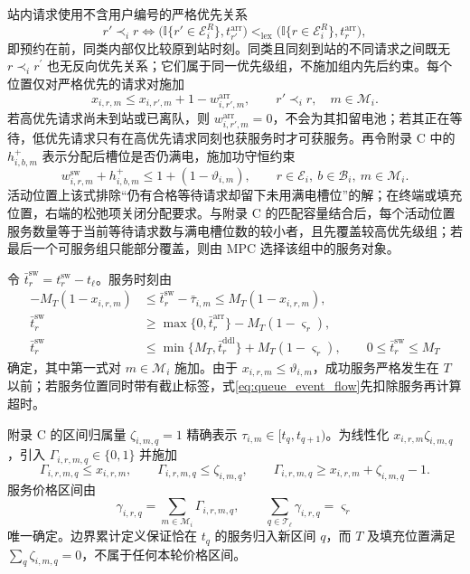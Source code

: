 \documentclass[12pt,a4paper,UTF8]{ctexart}
\begin{document}
站内请求使用不含用户编号的严格优先关系
\begin{equation}
r'\prec_i r
\Longleftrightarrow
\bigl(\mathbb I\{r'\in\mathcal E_i^R\},
t_{r'}^{\mathrm{arr}}\bigr)
<_{\mathrm{lex}}
\bigl(\mathbb I\{r\in\mathcal E_i^R\},
t_r^{\mathrm{arr}}\bigr),
\label{eq:reservation_priority}
\end{equation}
即预约在前，同类内部仅比较原到站时刻。同类且同刻到站的不同请求之间既无 $r\prec_i r^{\prime}$ 也无反向优先关系；它们属于同一优先级组，不施加组内先后约束。每个位置仅对严格优先的请求对施加
\begin{equation}
x_{i,r,m}
\le x_{i,r',m}+1-w_{i,r',m}^{\mathrm{arr}},
\qquad r'\prec_i r,\quad m\in\mathcal M_i.
\label{eq:reservation_service_order}
\end{equation}
若高优先请求尚未到站或已离队，则
$w_{i,r',m}^{\mathrm{arr}}=0$，不会为其扣留电池；若其正在等待，低优先请求只有在高优先请求同刻也获服务时才可获服务。再令附录 C 中的 $h_{i,b,m}^+$ 表示分配后槽位是否仍满电，施加功守恒约束
\begin{equation}
w_{i,r,m}^{\mathrm{sw}}+h_{i,b,m}^{+}
\le1+(1-\vartheta_{i,m}),
\qquad r\in\mathcal E_i,\ b\in\mathcal B_i,\ m\in\mathcal M_i.
\label{eq:work_conservation}
\end{equation}
活动位置上该式排除“仍有合格等待请求却留下未用满电槽位”的解；在终端或填充位置，右端的松弛项关闭分配要求。与附录 C 的匹配容量结合后，每个活动位置服务数量等于当前等待请求数与满电槽位数的较小者，且先覆盖较高优先级组；若最后一个可服务组只能部分覆盖，则由 MPC 选择该组中的服务对象。

令 $\bar t_r^{\mathrm{sw}}=t_r^{\mathrm{sw}}-t_\ell$。服务时刻由
\begin{subequations}
\label{eq:service_window}
\begin{align}
-M_T(1-x_{i,r,m})
&\le \bar t_r^{\mathrm{sw}}-\bar\tau_{i,m}
\le M_T(1-x_{i,r,m}),\\
\bar t_r^{\mathrm{sw}}
&\ge \max\{0,\bar t_r^{\mathrm{arr}}\}
-M_T(1-\varsigma_r),\\
\bar t_r^{\mathrm{sw}}
&\le \min\{M_T,\bar t_r^{\mathrm{ddl}}\}
+M_T(1-\varsigma_r),\qquad
0\le\bar t_r^{\mathrm{sw}}\le M_T
\end{align}
\end{subequations}
确定，其中第一式对 $m\in\mathcal M_i$ 施加。由于 $x_{i,r,m}\le \vartheta_{i,m}$，成功服务严格发生在 $T$ 以前；若服务位置同时带有截止标签，式\eqref{eq:queue_event_flow}先扣除服务再计算超时。

附录 C 的区间归属量 $\zeta_{i,m,q}=1$ 精确表示
$\tau_{i,m}\in[t_q,t_{q+1})$。为线性化
$x_{i,r,m}\zeta_{i,m,q}$，引入
$\Gamma_{i,r,m,q}\in\{0,1\}$ 并施加
\[
\Gamma_{i,r,m,q}\le x_{i,r,m},\qquad
\Gamma_{i,r,m,q}\le\zeta_{i,m,q},\qquad
\Gamma_{i,r,m,q}\ge x_{i,r,m}+\zeta_{i,m,q}-1.
\]
服务价格区间由
\begin{equation}
\gamma_{i,r,q}
=\sum_{m\in\mathcal M_i}\Gamma_{i,r,m,q},
\qquad
\sum_{q\in\mathcal T_\ell}\gamma_{i,r,q}=\varsigma_r
\label{eq:service_price_bin}
\end{equation}
唯一确定。边界累计定义保证恰在 $t_q$ 的服务归入新区间 $q$，而 $T$ 及填充位置满足 $\sum_q\zeta_{i,m,q}=0$，不属于任何本轮价格区间。
\end{document}

